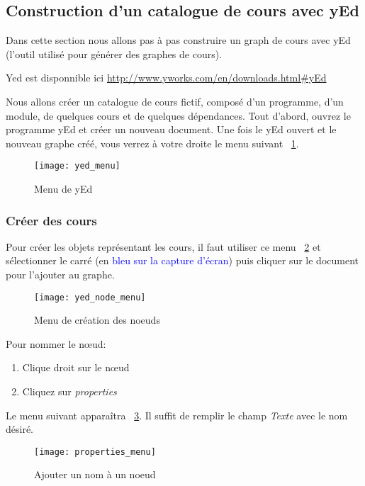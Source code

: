 \subsection{Construction d'un catalogue de cours avec yEd}
Dans cette section nous allons pas à pas construire un graph de cours avec yEd (l'outil utilisé pour générer des graphes de cours).

Yed est disponnible ici \url{http://www.yworks.com/en/downloads.html\#yEd}

Nous allons créer un  catalogue de cours fictif, composé d'un programme, d'un module, de quelques cours et de quelques dépendances. Tout d'abord, ouvrez le programme yEd et créer un nouveau document. Une fois le yEd ouvert et le nouveau graphe créé, vous verrez à votre droite le menu suivant ~\ref{fig:yed_menu}.

\begin{figure}[htb]
\centering
\caption{Menu de yEd}
\label{fig:yed_menu}
\texttt{[image: yed\_menu]}
\end{figure}


\subsubsection{Créer des cours}
Pour créer les objets représentant les cours, il faut utiliser ce menu ~\ref{fig:yed_node_menu} et sélectionner le carré (en \textcolor{blue}{bleu sur la capture d'écran}) puis cliquer sur le document pour l'ajouter au graphe.

\begin{figure}[htb]
\centering
\caption{Menu de création des noeuds}
\label{fig:yed_node_menu}
\texttt{[image: yed\_node\_menu]}
\end{figure}

Pour nommer le nœud:
\begin{enumerate}
\item Clique droit sur le nœud
\item Cliquez sur \textit{properties}
\end{enumerate}

Le menu suivant apparaîtra ~\ref{fig:properties_menu}. Il suffit de remplir le champ \textit{Texte} avec le nom désiré.

\begin{figure}[htb]
\centering
\caption{Ajouter un nom à un noeud}
\label{fig:properties_menu}
\texttt{[image: properties\_menu]}
\end{figure}


